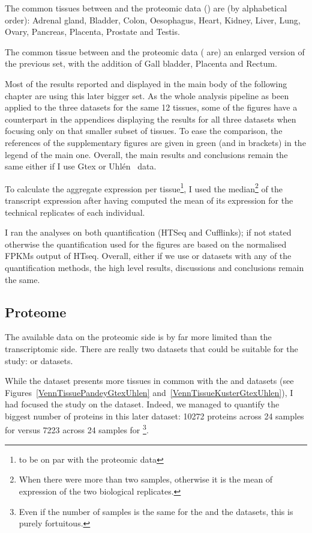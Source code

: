 The common tissues between  and the proteomic data
() are
(by alphabetical order):  Adrenal gland, Bladder, Colon, Oesophagus, Heart,
Kidney, Liver, Lung, Ovary, Pancreas, Placenta, Prostate and Testis.

The common tissue between  and the proteomic data
( are)
an enlarged version of the previous set, with the addition of Gall bladder,
Placenta and Rectum.

Most of the results reported and displayed in the main body
of the following chapter are using this later bigger set. As the whole analysis
pipeline as been applied to the three datasets
for the same 12 tissues, some of the figures have a counterpart in the
appendices displaying the results for all three datasets when focusing only on
that smaller subset of tissues. To ease the comparison, the references of the
supplementary figures are given in green (and in brackets) in the legend of the
main one. Overall, the main results and conclusions remain the same either if
I use Gtex or Uhlén \etal\ data.

To calculate the aggregate expression per tissue\footnote{to be on par with the
proteomic data}, I used the median\footnote{When there were more than
two samples, otherwise it is the mean of expression of the two biological
replicates.} of the transcript expression after having computed the mean of its
expression for the technical replicates of each individual.

I ran the analyses on both quantification (HTSeq and Cufflinks); if not stated
otherwise the quantification used for the figures are based on the normalised
\glspl{FPKM} output of HTseq. Overall, either if we use  or
 datasets with any of the quantification methods, the high level
results, discussions and conclusions remain the same.

\subsection{Proteome}

The available data on the proteomic side is by far more limited than the
transcriptomic side. There are really two datasets that could be suitable for
the study:  or  datasets.

While the  dataset presents more tissues in common
with the  and  datasets
(see Figures~\ref{VennTissuePandeyGtexUhlen}
and~\ref{VennTissueKusterGtexUhlen}), I had focused the study on
the  dataset. Indeed, we managed to quantify the biggest
number of proteins in this later dataset: 10272 proteins across 24 samples for
 versus 7223 across 24 samples for \footnote{Even
if the number of samples is the same for the  and
the  datasets, this is purely fortuitous.}.

